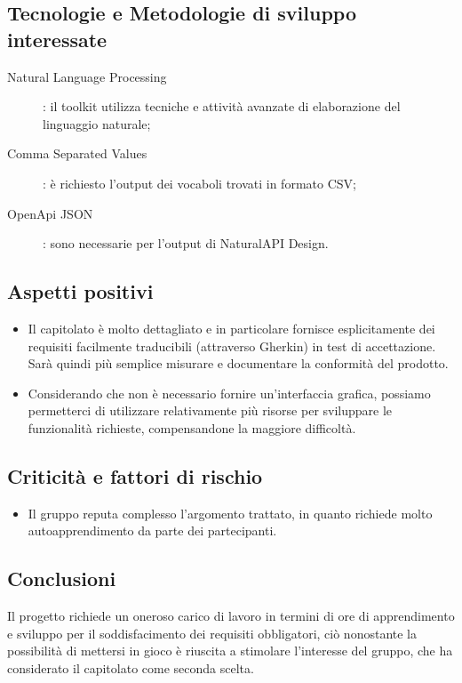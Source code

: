 \documentclass[../studio-di-fattibilita.tex]{subfiles}
\begin{document}
  \subsection{Tecnologie e Metodologie di sviluppo interessate}%
  \label{subsec:tecnologie_interessate}
  \begin{description}
    \item[Natural Language Processing]: il toolkit utilizza tecniche e attività avanzate di elaborazione del linguaggio naturale;
    \item[Comma Separated Values]: è richiesto l'output dei vocaboli trovati in formato CSV;
    \item[OpenApi JSON]: sono necessarie per l'output di NaturalAPI Design.
  \end{description}


  \subsection{Aspetti positivi}%
  \label{subsec:aspetti_positivi}
  \begin{itemize}
    \item Il capitolato è molto dettagliato e in particolare fornisce esplicitamente dei requisiti facilmente traducibili (attraverso Gherkin) in test di accettazione. Sarà quindi più semplice misurare e documentare la conformità del prodotto.
    \item Considerando che non è necessario fornire un'interfaccia grafica, possiamo permetterci di utilizzare relativamente più risorse per sviluppare le funzionalità richieste, compensandone la maggiore difficoltà.
  \end{itemize}


  \subsection{Criticità e fattori di rischio}%
  \label{subsec:criticita_e_fattori_di_rischio}
  \begin{itemize}
    \item Il gruppo reputa complesso l'argomento trattato, in quanto richiede molto autoapprendimento da parte dei partecipanti.
  \end{itemize}


  \subsection{Conclusioni}%
  \label{subsec:conclusioni}
  Il progetto richiede un oneroso carico di lavoro in termini di ore di apprendimento e sviluppo per il soddisfacimento dei requisiti obbligatori, ciò nonostante la possibilità di mettersi in gioco è riuscita a stimolare l'interesse del gruppo, che ha considerato il capitolato come seconda scelta.
\end{document}
